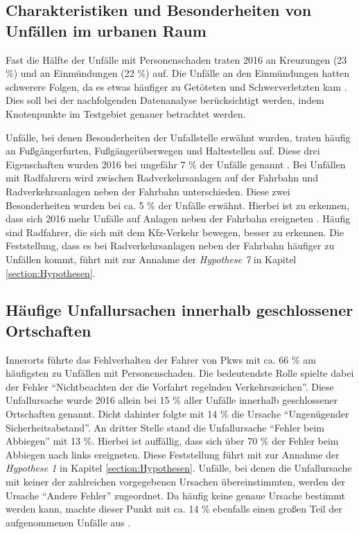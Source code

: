 \subsection{Charakteristiken und Besonderheiten von Unfällen im urbanen Raum}
Fast die Hälfte der Unfälle mit Personenschaden traten 2016 an Kreuzungen (23 \%) und an Einmündungen (22 \%) auf. Die Unfälle an den Einmündungen hatten schwerere Folgen, da es etwas häufiger zu Getöteten und Schwerverletzten kam \parencite[S. 88]{StatistischesBundesamt.2017}. Dies soll bei der nachfolgenden Datenanalyse berücksichtigt werden, indem Knotenpunkte im Testgebiet genauer betrachtet werden.

Unfälle, bei denen Besonderheiten der Unfallstelle erwähnt wurden, traten häufig an Fußgängerfurten, Fußgängerüberwegen und Haltestellen auf. Diese drei Eigenschaften wurden 2016 bei ungefähr 7 \% der Unfälle genannt \parencite[S. 88]{StatistischesBundesamt.2017}. Bei Unfällen mit Radfahrern wird zwischen Radverkehrsanlagen auf der Fahrbahn und Radverkehrsanlagen neben der Fahrbahn unterschieden. Diese zwei Besonderheiten wurden bei ca. 5 \% der Unfälle erwähnt. Hierbei ist zu erkennen, dass sich 2016 mehr Unfälle auf Anlagen neben der Fahrbahn ereigneten \parencite[S. 88]{StatistischesBundesamt.2017}. Häufig sind Radfahrer, die sich mit dem Kfz-Verkehr bewegen, besser zu erkennen. Die Feststellung, dass es bei Radverkehrsanlagen neben der Fahrbahn häufiger zu Unfällen kommt, führt mit zur Annahme der \textit{Hypothese 7} in Kapitel \ref{section:Hypothesen}.

\subsection{Häufige Unfallursachen innerhalb geschlossener Ortschaften}\label{chapter:Unfallursachen innerorts}
Innerorts führte das Fehlverhalten der Fahrer von Pkws mit ca. 66 \% am häufigsten zu Unfällen mit Personenschaden. Die bedeutendste Rolle spielte dabei der Fehler \enquote{Nichtbeachten der die Vorfahrt regelnden Verkehrszeichen}. Diese Unfallursache wurde 2016 allein bei 15 \% aller Unfälle innerhalb geschlossener Ortschaften genannt. Dicht dahinter folgte mit 14 \% die Ursache \enquote{Ungenügender Sicherheitsabstand}. An dritter Stelle stand die Unfallursache \enquote{Fehler beim Abbiegen} mit 13 \%. Hierbei ist auffällig, dass sich über 70 \% der Fehler beim Abbiegen nach links ereigneten. Diese Feststellung führt mit zur Annahme der \textit{Hypothese 1} in Kapitel \ref{section:Hypothesen}. Unfälle, bei denen die Unfallursache mit keiner der zahlreichen vorgegebenen Ursachen übereinstimmten, werden der Ursache \enquote{Andere Fehler} zugeordnet. Da häufig keine genaue Ursache bestimmt werden kann, machte dieser Punkt mit ca. 14 \% ebenfalls einen großen Teil der aufgenommenen Unfälle aus \parencite[S. 274-277]{StatistischesBundesamt.2018b}.

